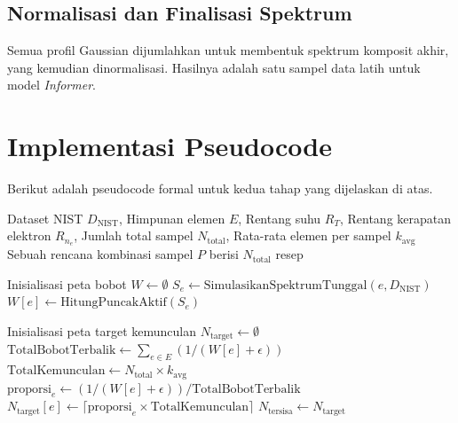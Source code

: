 \begin{onehalfspace}
\subsection*{Normalisasi dan Finalisasi Spektrum}
Semua profil Gaussian dijumlahkan untuk membentuk spektrum komposit akhir, yang kemudian dinormalisasi. Hasilnya adalah satu sampel data latih untuk model \textit{Informer}.

\section*{Implementasi Pseudocode}
Berikut adalah pseudocode formal untuk kedua tahap yang dijelaskan di atas.

\begin{algorithm}[H]
\small
\caption{Algoritma Pembangkitan Rencana Kombinasi Sampel}
\label{app:algo1}
\begin{algorithmic}[1]
    \REQUIRE Dataset NIST $D_{\text{NIST}}$, Himpunan elemen $E$, Rentang suhu $R_T$, Rentang kerapatan elektron $R_{n_e}$, Jumlah total sampel $N_{\text{total}}$, Rata-rata elemen per sampel $k_{\text{avg}}$
    \ENSURE Sebuah rencana kombinasi sampel $P$ berisi $N_{\text{total}}$ resep
    
    \STATE {}
    \STATE Inisialisasi peta bobot $W \gets \emptyset$
        \STATE $S_e \gets \text{SimulasikanSpektrumTunggal}(e, D_{\text{NIST}})$
        \STATE $W[e] \gets \text{HitungPuncakAktif}(S_e)$ 
    \ENDFOR
    
    \STATE {}
    \STATE Inisialisasi peta target kemunculan $N_{\text{target}} \gets \emptyset$
    \STATE $\text{TotalBobotTerbalik} \gets \sum_{e \in E} (1 / (W[e] + \epsilon))$ 
    \STATE $\text{TotalKemunculan} \gets N_{\text{total}} \times k_{\text{avg}}$
        \STATE $\text{proporsi}_e \gets (1 / (W[e] + \epsilon)) / \text{TotalBobotTerbalik}$
        \STATE $N_{\text{target}}[e] \gets \lceil \text{proporsi}_e \times \text{TotalKemunculan} \rceil$
    \ENDFOR
    \STATE $N_{\text{tersisa}} \gets N_{\text{target}}$ 
    

\end{algorithmic}
\end{algorithm}
\end{onehalfspace}
